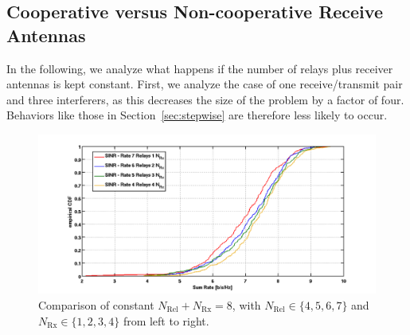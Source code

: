 \subsection{Cooperative versus Non-cooperative Receive Antennas}
\label{sec:rel_rx_comp}
In the following, we analyze what happens if the number of relays plus receiver antennas is kept constant.
First, we analyze the case of one receive/transmit pair and three interferers, as this decreases the size of the problem by a factor of four.
Behaviors like those in Section~\ref{sec:stepwise} are therefore less likely to occur.
\begin{figure}[h]
\centering
  \includegraphics[width=\linewidth]{images/ConstNrelNrx8comparison_1Rx_onlySINR.png}
\caption{Comparison of constant $N_\text{Rel} + N_{\text{Rx}} = 8$, with $N_\text{Rel}\in\{4,5,6,7\}$ and $N_{\text{Rx}}\in\{1,2,3,4\}$ from left to right.}
\label{fig:1user_const}
\end{figure}

